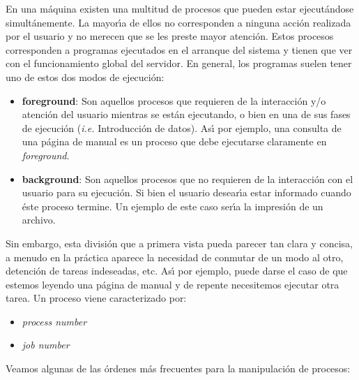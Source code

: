 En una m{\'a}quina existen una multitud de procesos que pueden estar
ejecut{\'a}ndose simult{\'a}nemente. La mayor{\'\i}a de ellos no corresponden a
ninguna acci{\'o}n realizada por el usuario y no merecen que se les
preste mayor atenci{\'o}n.  Estos procesos corresponden a programas
ejecutados en el arranque del sistema y tienen que ver con el
funcionamiento global del servidor. En general, los programas suelen
tener uno de estos dos modos de ejecuci{\'o}n:
\begin{itemize}
  
\item {\bf foreground}: Son aquellos procesos que requieren de la
  interacci{\'o}n y/o atenci{\'o}n del usuario mientras se est{\'a}n ejecutando,
  o bien en una de sus fases de ejecuci{\'o}n ({\it i.e.} Introducci{\'o}n de
  datos). As{\'\i} por ejemplo, una consulta de una p{\'a}gina de manual es
  un proceso que debe ejecutarse claramente en {\it foreground}.
  
\item {\bf background}: Son aquellos procesos que no requieren de la
  interacci{\'o}n con el usuario para su ejecuci{\'o}n. Si bien el usuario
  desear{\'\i}a estar informado cuando {\'e}ste proceso termine. Un ejemplo
  de este caso ser{\'\i}a la impresi{\'o}n de un archivo.
\end{itemize}  

Sin embargo, esta divisi{\'o}n que a primera vista pueda parecer tan clara
y concisa, a menudo en la pr{\'a}ctica aparece la necesidad de conmutar de
un modo al otro, detenci{\'o}n de tareas indeseadas, etc.  As{\'\i} por
ejemplo, puede darse el caso de que estemos leyendo una p{\'a}gina de
manual y de repente necesitemos ejecutar otra tarea.  Un proceso viene
caracterizado por:

\begin{itemize}

\item {\it process number}

\item {\it job number}

\end{itemize}

Veamos algunas de las {\'o}rdenes m{\'a}s frecuentes para la manipulaci{\'o}n de
procesos:

